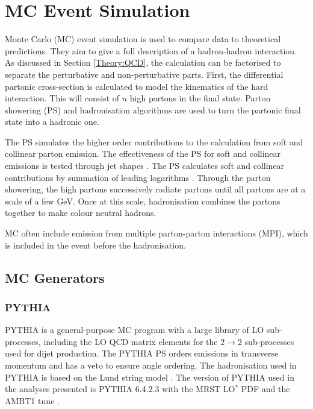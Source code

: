 \section{MC Event Simulation}
\label{Theory:MC}


Monte Carlo (MC) event simulation is used to compare data to theoretical predictions. 
They aim to give a full description of a hadron-hadron interaction.
As discussed in Section \ref{Theory:QCD}, the calculation can be factorised to separate the perturbative and non-perturbative parts. 
First, the differential partonic cross-section is calculated to model the kinematics of the hard interaction.
This will consist of $n$ high \pt{} partons in the final state.
Parton showering (PS) and hadronisation algorithms are used to turn the partonic final state into a hadronic one.

The PS simulates the higher order contributions to the calculation from soft and collinear parton emission.
The effectiveness of the PS for soft and collinear emissions is tested through jet shapes \cite{ref:JetSh}.
The PS calculates soft and collinear contributions by summation of leading logarithms \cite{ref:Webber}.
Through the parton showering, the high \pt{} partons successively radiate partons until all partons are at a scale of a few GeV.
Once at this scale, hadronisation combines the partons together to make colour neutral hadrons. 

MC often include emission from multiple parton-parton interactions (MPI), which is included in the event before the hadronisation.



\subsection{MC Generators}
\subsubsection{PYTHIA}

PYTHIA \cite{ref:PYTHIA64} is a general-purpose MC program with a large library of LO sub-processes, including the LO QCD matrix elements for the $2 \rightarrow 2$ sub-processes used for dijet production.
The PYTHIA PS orders emissions in transverse momentum and has a veto to ensure angle ordering. 
The hadronisation used in PYTHIA is based on the Lund string model \cite{ref:Lund}.
The version of PYTHIA used in the analyses presented is PYTHIA 6.4.2.3 with the MRST LO$^*$ PDF \cite{ref:MRST} and the AMBT1 tune \cite{ref:Tune}.

